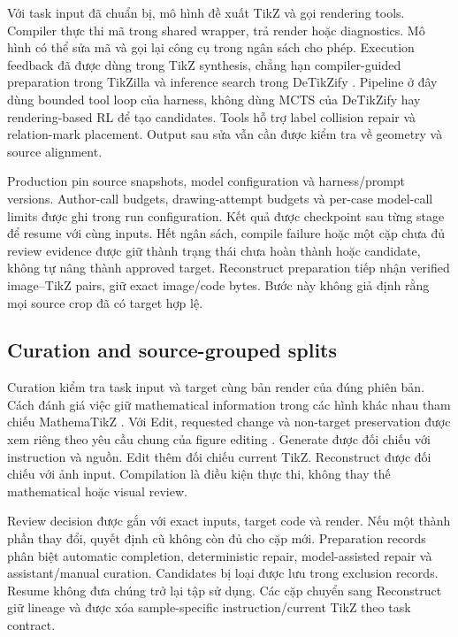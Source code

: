 \documentclass[a4paper,12pt]{article}
\begin{document}
Với task input đã chuẩn bị, mô hình đề xuất TikZ và gọi rendering tools. Compiler thực thi mã trong shared wrapper, trả render hoặc diagnostics. Mô hình có thể sửa mã và gọi lại công cụ trong ngân sách cho phép. Execution feedback đã được dùng trong TikZ synthesis, chẳng hạn compiler-guided preparation trong TikZilla và inference search trong DeTikZify \cite{tikzilla,detikzify}. Pipeline ở đây dùng bounded tool loop của harness, không dùng MCTS của DeTikZify hay rendering-based RL để tạo candidates. Tools hỗ trợ label collision repair và relation-mark placement. Output sau sửa vẫn cần được kiểm tra về geometry và source alignment.

Production pin source snapshots, model configuration và harness/prompt versions. Author-call budgets, drawing-attempt budgets và per-case model-call limits được ghi trong run configuration. Kết quả được checkpoint sau từng stage để resume với cùng inputs. Hết ngân sách, compile failure hoặc một cặp chưa đủ review evidence được giữ thành trạng thái chưa hoàn thành hoặc candidate, không tự nâng thành approved target. Reconstruct preparation tiếp nhận verified image--TikZ pairs, giữ exact image/code bytes. Bước này không giả định rằng mọi source crop đã có target hợp lệ.

\subsection{Curation and source-grouped splits}
\label{sec:data-curation}
Curation kiểm tra task input và target cùng bản render của đúng phiên bản. Cách đánh giá việc giữ mathematical information trong các hình khác nhau tham chiếu MathemaTikZ \cite{mathematikz}. Với Edit, requested change và non-target preservation được xem riêng theo yêu cầu chung của figure editing \cite{edit2tikz,editikz}. Generate được đối chiếu với instruction và nguồn. Edit thêm đối chiếu current TikZ. Reconstruct được đối chiếu với ảnh input. Compilation là điều kiện thực thi, không thay thế mathematical hoặc visual review.

Review decision được gắn với exact inputs, target code và render. Nếu một thành phần thay đổi, quyết định cũ không còn đủ cho cặp mới. Preparation records phân biệt automatic completion, deterministic repair, model-assisted repair và assistant/manual curation. Candidates bị loại được lưu trong exclusion records. Resume không đưa chúng trở lại tập sử dụng. Các cặp chuyển sang Reconstruct giữ lineage và được xóa sample-specific instruction/current TikZ theo task contract.
\end{document}
